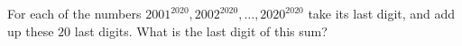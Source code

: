 For each of the numbers $2001^{2020},2002^{2020},\dots,2020^{2020}$ take its last digit, and add up these $20$ last digits. What is the last digit of this sum?
